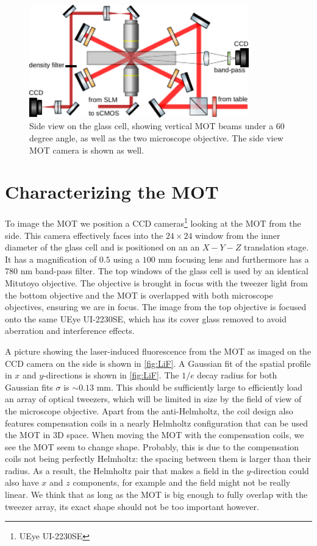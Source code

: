 \begin{figure}
    \centering
    \includegraphics[width=0.85\textwidth]{figures/MOTsideview.pdf}
    \caption{Side view on the glass cell, showing vertical MOT beams under a 60 degree angle, as well as the two microscope objective. 
    The side view MOT camera is shown as well.}
    \label{fig:GlassCellSide}
\end{figure}


\section{Characterizing the MOT}\label{sec:MOTresult}

To image the MOT we position a CCD cameras\footnote{UEye UI-2230SE} looking at the MOT from the side.
This camera effectively faces into the $24\times24$ window from the inner diameter of the glass cell and is positioned on an an $X-Y-Z$ translation stage.
It has a magnification of $0.5$ using a $100$ mm focusing lens and furthermore has a 780 nm band-pass filter. 
The top windows of the glass cell is used by an identical Mitutoyo objective. 
The objective is brought in focus with the tweezer light from the bottom objective and the MOT is overlapped with both microscope objectives, ensuring we are in focus.
The image from the top objective is focused onto the same UEye UI-2230SE, which has its cover glass removed to avoid aberration and interference effects. 


A picture showing the laser-induced fluorescence from the MOT as imaged on the CCD camera on the side is shown in \cref{fig:LiF}.
A Gaussian fit of the spatial profile in $x$ and $y$-directions is shown in \cref{fig:LiF}.
The $1/e$ decay radius for both Gaussian fits $\sigma$ is $\sim 0.13$ mm. 
This should be sufficiently large to efficiently load an array of optical tweezers, which will be limited in size by the field of view of the microscope objective. 
Apart from the anti-Helmholtz, the coil design also features compensation coils in a nearly Helmholtz configuration that can be used the MOT in 3D space. 
When moving the MOT with the compensation coils, we see the MOT seem to change shape. 
Probably, this is due to the compensation coils not being perfectly Helmholtz: the spacing between them is larger than their radius.  
As a result, the Helmholtz pair that makes a field in the $y$-direction could also have $x$ and $z$ components, for example and the field might not be really linear. 
We think that as long as the MOT is big enough to fully overlap with the tweezer array, its exact shape should not be too important however. 


